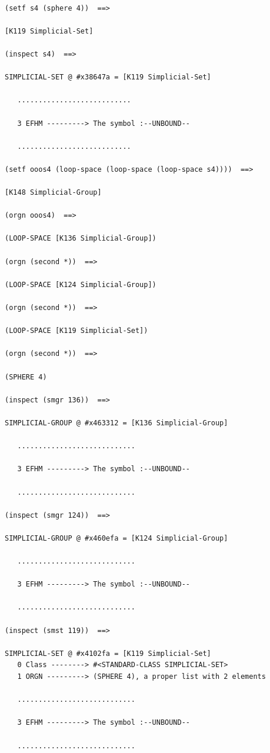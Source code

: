 {\footnotesize\begin{verbatim}

(setf s4 (sphere 4))  ==>

[K119 Simplicial-Set]

(inspect s4)  ==>

SIMPLICIAL-SET @ #x38647a = [K119 Simplicial-Set]

   ...........................

   3 EFHM ---------> The symbol :--UNBOUND--

   ...........................

(setf ooos4 (loop-space (loop-space (loop-space s4))))  ==> 

[K148 Simplicial-Group]

(orgn ooos4)  ==>

(LOOP-SPACE [K136 Simplicial-Group])

(orgn (second *))  ==>

(LOOP-SPACE [K124 Simplicial-Group])

(orgn (second *))  ==>

(LOOP-SPACE [K119 Simplicial-Set])

(orgn (second *))  ==>

(SPHERE 4)

(inspect (smgr 136))  ==>

SIMPLICIAL-GROUP @ #x463312 = [K136 Simplicial-Group]

   ............................

   3 EFHM ---------> The symbol :--UNBOUND--

   ............................

(inspect (smgr 124))  ==>

SIMPLICIAL-GROUP @ #x460efa = [K124 Simplicial-Group]

   ............................

   3 EFHM ---------> The symbol :--UNBOUND--

   ............................

(inspect (smst 119))  ==>

SIMPLICIAL-SET @ #x4102fa = [K119 Simplicial-Set]
   0 Class --------> #<STANDARD-CLASS SIMPLICIAL-SET>
   1 ORGN ---------> (SPHERE 4), a proper list with 2 elements

   ............................

   3 EFHM ---------> The symbol :--UNBOUND--

   ............................


\end{verbatim}}
